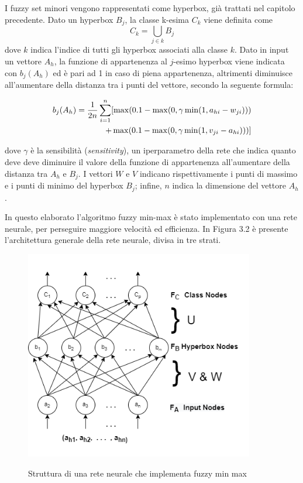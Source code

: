 \documentclass[11pt,  oneside, openany]{book}
\begin{document}
I fuzzy set minori vengono rappresentati come hyperbox, già trattati nel capitolo precedente. Dato un hyperbox $B_j$, la classe k-esima $C_k$ viene definita come
$$ C_k = \bigcup_{j \in k} B_j $$
\noindent dove $k$ indica l'indice di tutti gli hyperbox associati alla classe $k$. %
Dato in input un vettore $A_h$, la funzione di appartenenza  al $j$-esimo hyperbox viene indicata con $b_j(A_h)$ ed è pari ad 1 in caso di piena appartenenza, altrimenti diminuisce all'aumentare della distanza tra i punti del vettore, secondo la seguente formula: 

\begin{equation} \label{eq:1}
\begin{split}
 b_j (A_h) = {1 \over 2n} \sum_{i=1}^n [\max (0.1-\max (0, \gamma \min (1, a_{hi} - w_{ji}))) \\
+ \max(0.1-\max(0, \gamma \min(1, v_{ji} - a_{hi})))]
\end{split}
\end{equation}

\noindent dove $\gamma$ è la sensibilità (\textit{sensitivity}), un iperparametro della rete che indica quanto deve deve diminuire il valore della funzione di appartenenza all'aumentare della distanza tra $A_h$ e $B_j$. I vettori $W$ e $V$ indicano rispettivamente i punti di massimo e i punti di minimo del hyperbox $B_j$; infine, $n$ indica la dimensione del vettore $A_h$. 

In questo elaborato l'algoritmo fuzzy min-max è stato implementato con una rete neurale, per perseguire maggiore velocità ed efficienza. In Figura 3.2 è presente l'architettura generale della rete neurale, divisa in tre strati. 


\begin{figure}[h!]
\begin{center}
  \includegraphics[width=10cm]{Immagini/architecture_FMMNN.png}\\
  \caption{Struttura di una rete neurale che implementa fuzzy min max}
\end{center}
\end{figure}
\end{document}
